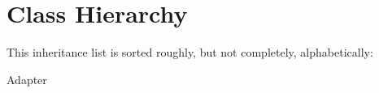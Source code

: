 \section{Class Hierarchy}
This inheritance list is sorted roughly, but not completely, alphabetically\+:\begin{DoxyCompactList}
\item {}
\item Adapter\begin{DoxyCompactList}
\item {}
\end{DoxyCompactList}
\end{DoxyCompactList}
